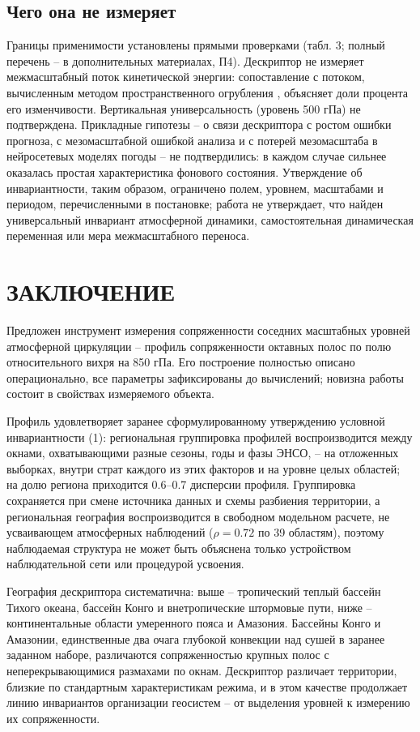 \documentclass[12pt,a4paper]{article}
\begin{document}
\subsection{Чего она не измеряет}

Границы применимости установлены прямыми проверками (табл. 3; полный перечень -- в дополнительных материалах, П4). Дескриптор не измеряет межмасштабный поток кинетической энергии: сопоставление с потоком, вычисленным методом пространственного огрубления \cite{Germano1992,Aluie2018}, объясняет доли процента его изменчивости. Вертикальная универсальность (уровень 500 гПа) не подтверждена. Прикладные гипотезы -- о связи дескриптора с ростом ошибки прогноза, с мезомасштабной ошибкой анализа и с потерей мезомасштаба в нейросетевых моделях погоды \cite{Lam2023,Bi2023,Price2025,Rasp2024} -- не подтвердились: в каждом случае сильнее оказалась простая характеристика фонового состояния. Утверждение об инвариантности, таким образом, ограничено полем, уровнем, масштабами и периодом, перечисленными в постановке; работа не утверждает, что найден универсальный инвариант атмосферной динамики, самостоятельная динамическая переменная или мера межмасштабного переноса.

\section{ЗАКЛЮЧЕНИЕ}

Предложен инструмент измерения сопряженности соседних масштабных уровней атмосферной циркуляции -- профиль сопряженности октавных полос по полю относительного вихря на 850 гПа. Его построение полностью описано операционально, все параметры зафиксированы до вычислений; новизна работы состоит в свойствах измеряемого объекта.

Профиль удовлетворяет заранее сформулированному утверждению условной инвариантности (1): региональная группировка профилей воспроизводится между окнами, охватывающими разные сезоны, годы и фазы ЭНСО, -- на отложенных выборках, внутри страт каждого из этих факторов и на уровне целых областей; на долю региона приходится 0.6--0.7 дисперсии профиля. Группировка сохраняется при смене источника данных и схемы разбиения территории, а региональная география воспроизводится в свободном модельном расчете, не усваивающем атмосферных наблюдений ($\rho = 0.72$ по 39 областям), поэтому наблюдаемая структура не может быть объяснена только устройством наблюдательной сети или процедурой усвоения.

География дескриптора систематична: выше -- тропический теплый бассейн Тихого океана, бассейн Конго и внетропические штормовые пути, ниже -- континентальные области умеренного пояса и Амазония. Бассейны Конго и Амазонии, единственные два очага глубокой конвекции над сушей в заранее заданном наборе, различаются сопряженностью крупных полос с неперекрывающимися размахами по окнам. Дескриптор различает территории, близкие по стандартным характеристикам режима, и в этом качестве продолжает линию инвариантов организации геосистем -- от выделения уровней к измерению их сопряженности.
\end{document}

